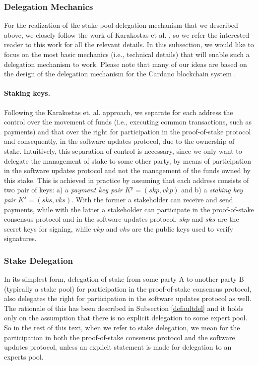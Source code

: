 \subsubsection{Delegation Mechanics}
For the realization of the stake pool delegation mechanism that we described above, we closely follow the work of Karakostas et al. \cite{stakepools}, so we refer the interested reader to this work for all the relevant details.
In this subsection, we would like to focus
on the most basic mechanics (i.e., technical details) that will enable such a delegation mechanism to work. Please note that many of our ideas are based on the design of the delegation mechanism for the Cardano blockchain system \cite{deldesign}. %
\paragraph{Staking keys.}
Following the Karakostas et. al. \cite{stakepools} approach, we separate for each address the control over the movement of funds (i.e., executing common transactions, such as payments) and that over the right for participation in the proof-of-stake protocol and consequently, in the software updates protocol, due to the ownership of stake. Intuitively, this separation of control is necessary, since we only want to delegate the management of stake to some other party, by means of participation in the software updates protocol and not the management of the funds owned by this stake. This is achieved in practice by assuming that each address consists of two pair of keys: a) a \emph{payment key pair} $K^p = (skp,vkp)$ and b) a \emph{staking key pair} $K^s = (sks, vks)$. With the former a stakeholder can receive and send payments, while with the latter a stakeholder can participate in the proof-of-stake consensus protocol and in the software updates protocol. $skp$ and $sks$ are the secret keys for signing, while $vkp$ and $vks$ are the public keys used to verify signatures.

\subsubsection*{Stake Delegation}
In its simplest form, delegation of stake from some party A to another party B (typically a stake pool) for participation in the proof-of-stake consensus protocol, also delegates the right for participation in the software updates protocol as well. The rationale of this has been described in Subsection \ref{defaultdel} and it holds only on the assumption that there is no explicit delegation to some expert pool. So in the rest of this text, when we refer to stake delegation, we mean for the participation in both the proof-of-stake consensus protocol and the software updates protocol, unless an explicit statement is made for delegation to an experts pool.

